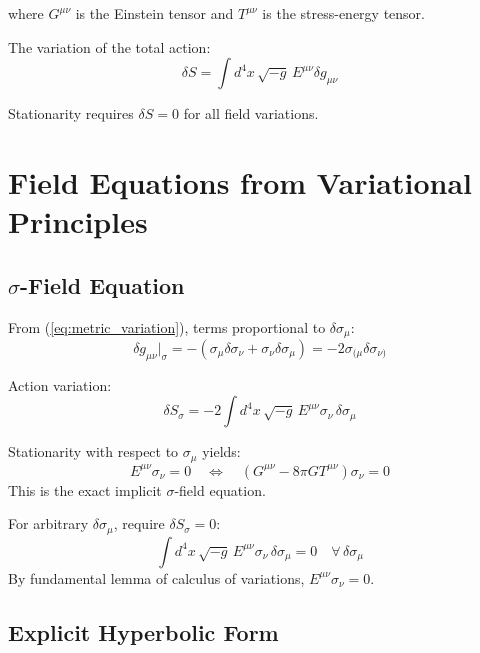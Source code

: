 \documentclass[11pt,a4paper]{article}
\theoremstyle{definition}
\theoremstyle{remark}
\begin{document}
		where $G^{\mu\nu}$ is the Einstein tensor and $T^{\mu\nu}$ is the stress-energy tensor.
		
		The variation of the total action:
		\begin{equation}\label{eq:action_variation}
			\delta S = \int d^4x\, \sqrt{-g}\, E^{\mu\nu}\delta g_{\mu\nu}
		\end{equation}
		
		Stationarity requires $\delta S = 0$ for all field variations.
		
		\section{Field Equations from Variational Principles}
		
		\subsection{$\sigma$-Field Equation}
		
		From (\ref{eq:metric_variation}), terms proportional to $\delta\sigma_\mu$:
		\begin{equation}
			\delta g_{\mu\nu}\big|_{\sigma} = -(\sigma_\mu\delta\sigma_\nu + \sigma_\nu\delta\sigma_\mu) = -2\sigma_{(\mu}\delta\sigma_{\nu)}
		\end{equation}
		
		Action variation:
		\begin{equation}
			\delta S_\sigma = -2\int d^4x\, \sqrt{-g}\, E^{\mu\nu}\sigma_\nu\, \delta\sigma_\mu
		\end{equation}
		
			Stationarity with respect to $\sigma_\mu$ yields:
			\begin{equation}\label{eq:sigma_implicit}
				\boxed{E^{\mu\nu}\sigma_\nu = 0 \quad \Leftrightarrow \quad (G^{\mu\nu} - 8\pi G T^{\mu\nu})\sigma_\nu = 0}
			\end{equation}
			This is the exact implicit $\sigma$-field equation.
		
			For arbitrary $\delta\sigma_\mu$, require $\delta S_\sigma = 0$:
			\begin{equation}
				\int d^4x\, \sqrt{-g}\, E^{\mu\nu}\sigma_\nu\, \delta\sigma_\mu = 0 \quad \forall\, \delta\sigma_\mu
			\end{equation}
			By fundamental lemma of calculus of variations, $E^{\mu\nu}\sigma_\nu = 0$.
		
		\subsection{Explicit Hyperbolic Form}
		
\end{document}
